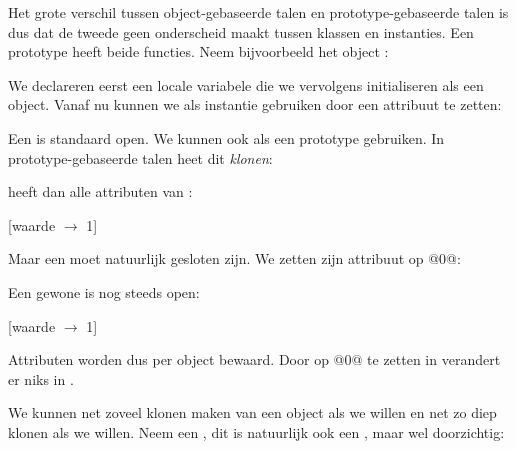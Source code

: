 Het grote verschil tussen object-gebaseerde talen en prototype-gebaseerde talen is dus dat de tweede geen onderscheid maakt tussen klassen en instanties. Een prototype heeft beide functies. Neem bijvoorbeeld het object :

\newCodeFragment

\begin{codelines}
\end{codelines}

We declareren eerst een locale variabele die we vervolgens initialiseren als een object. Vanaf nu kunnen we  als instantie gebruiken door een attribuut te zetten:

\begin{codelines}
\end{codelines}

Een  is standaard open. We kunnen  ook als een prototype gebruiken. In prototype-gebaseerde talen heet dit \emph{klonen}:

\begin{codelines}
\end{codelines}

 heeft dan alle attributen van :

\begin{codelines}
  [waarde $\to$ 1]
\end{codelines}

Maar een  moet natuurlijk gesloten zijn. We zetten zijn attribuut  op @0@:

\begin{codelines}
\end{codelines}

Een gewone  is nog steeds open:

\begin{codelines}
  [waarde $\to$ 1]
\end{codelines}

Attributen worden dus per object bewaard. Door  op @0@ te zetten in  verandert er niks in .

We kunnen net zoveel klonen maken van een object als we willen en net zo diep klonen als we willen. Neem een , dit is natuurlijk ook een , maar wel doorzichtig:

